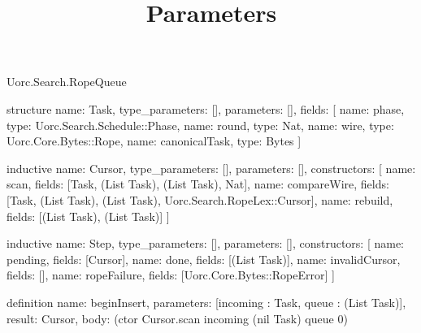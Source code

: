 \begin{lexlean}{Uorc.Search.RopeQueue}
\title{Parameters}
\begin{semanticmodule}
structure{
  name: Task,
  type_parameters: [],
  parameters: [],
  fields: [
    {name: phase, type: Uorc.Search.Schedule::Phase},
    {name: round, type: Nat},
    {name: wire, type: Uorc.Core.Bytes::Rope},
    {name: canonicalTask, type: Bytes}
  ]
}

inductive{
  name: Cursor,
  type_parameters: [],
  parameters: [],
  constructors: [
    {name: scan, fields: [Task, (List Task), (List Task), Nat]},
    {name: compareWire, fields: [Task, (List Task), (List Task), Uorc.Search.RopeLex::Cursor]},
    {name: rebuild, fields: [(List Task), (List Task)]}
  ]
}

inductive{
  name: Step,
  type_parameters: [],
  parameters: [],
  constructors: [
    {name: pending, fields: [Cursor]},
    {name: done, fields: [(List Task)]},
    {name: invalidCursor, fields: []},
    {name: ropeFailure, fields: [Uorc.Core.Bytes::RopeError]}
  ]
}

definition{
  name: beginInsert,
  parameters: [incoming : Task, queue : (List Task)],
  result: Cursor,
  body: (ctor Cursor.scan incoming (nil Task) queue 0)
}


\end{semanticmodule}
\end{lexlean}
